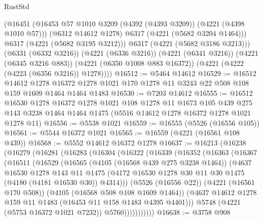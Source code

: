 \begin{lexlean}{RustStd}
\begin{coremodule}
            (@16451
              (@16453 @57 @1010 @3209 (@4392 (@4393 @3209)) (@4221 (@4398 @1010 @57)))
              (@6312 @14612 @1278)
              @6317
              (@4221 (@5682 @3204 @1464)))
            @6317
            (@4221 (@5682 @3195 @3212)))
          @6317
          (@4221 (@5682 @3186 @3213)))
        (@6331 (@6332 @3216))
        (@4221 (@6336 @3216))
        (@4221 (@6341 @3216))
        (@4221 (@6345 @3216 @883))
        (@4221 (@6350 @1008 @883 @16372))
        (@4221 (@4222 (@4223 (@6356 @3216)) @1278))))
@16512 := @5464 @14612
@16529 := @16512
    @14612
    @1278
    @16372
    @1278
    @1021
    @170
    @1278
    @11
    @3243
    @22
    @508
    @108
    @159
    @1609
    @1464
    @1464
    @1483
@16530 := @7203 @14612
@16555 := @16512
    @16530
    @1278
    @16372
    @1278
    @1021
    @108
    @1278
    @11
    @1673
    @105
    @439
    @275
    @143
    @3238
    @1464
    @1464
    @1475
    (@5516 @14612 @1278 @16372 @1278 @1021 @1278 @11)
@16556 := @5538 @1021
@16559 := @16555 (@5526 (@16556 @105))
@16561 := @5544 @16372 @1021
@16565 := @16559 (@4221 (@16561 @108 @439))
@16568 := @5552 @14612 @16372 @1278
@16637 := @16213
    (@16238
      (@16279
        (@16281
          (@16283
            (@16304
              (@16322
                (@16339
                  (@16352
                    (@16363
                      (@16367
                        (@16511
                          (@16529
                            (@16565
                              (@4105 (@16568 @439 @275 @3238 @1464))
                              (@4637
                                @16530
                                @1278
                                @143
                                @11
                                @1475
                                (@4172
                                  @16530
                                  @1278
                                  @30
                                  @11
                                  @30
                                  @1475
                                  (@4180 (@4181 @16530 @30))
                                  @4314)))
                            (@5526 (@16556 @22))
                            (@4221 (@16561 @170 @508))
                            (@4105 (@16568 @508 @108 @1609 @1464))
                            (@4637 @14612 @1278 @159 @11 @1483 (@16453 @11 @158 @1483 @4395 @4401)))
                          @5748
                          (@4221 (@5753 @16372 @1021 @7232))
                          @5760)))))))))))
@16638 := @3758 @908

\end{coremodule}
\end{lexlean}
